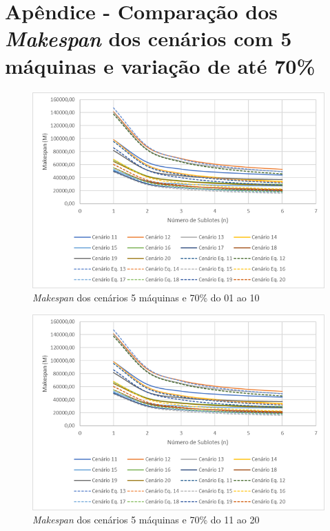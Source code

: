 \newpage
\section{Apêndice - Comparação dos \textit{Makespan} dos cenários com 5 máquinas e variação de até 70\%}\label{app:fig05machine70}

\begin{figure}[H]
    \centering
    \includegraphics[width=13cm]{Apendices/Figuras/05m70_11-20}
    \caption{\textit{Makespan} dos cenários 5 máquinas e 70\% do 01 ao 10}
    \label{fig:05m70_01-10}
\end{figure}

\begin{figure}[H]
    \centering
    \includegraphics[width=13cm]{Apendices/Figuras/05m70_11-20}
    \caption{\textit{Makespan} dos cenários 5 máquinas e 70\% do 11 ao 20}
    \label{fig:05m70_11-20}
\end{figure}

